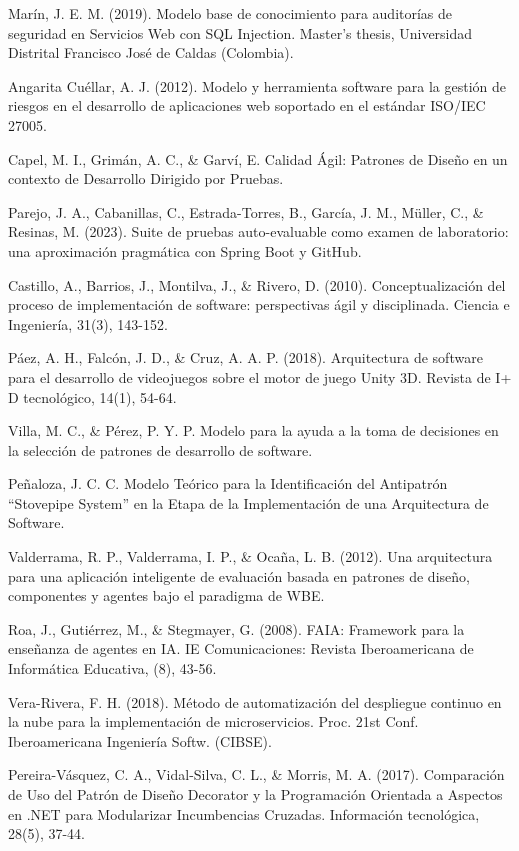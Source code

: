 \documentclass[12pt]{article}
\begin{document}
Marín, J. E. M. (2019). Modelo base de conocimiento para auditorías de seguridad en Servicios Web con SQL Injection. Master's thesis, Universidad Distrital Francisco José de Caldas (Colombia).

Angarita Cuéllar, A. J. (2012). Modelo y herramienta software para la gestión de riesgos en el desarrollo de aplicaciones web soportado en el estándar ISO/IEC 27005.

Capel, M. I., Grimán, A. C., & Garví, E. Calidad Ágil: Patrones de Diseño en un contexto de Desarrollo Dirigido por Pruebas.

Parejo, J. A., Cabanillas, C., Estrada-Torres, B., García, J. M., Müller, C., & Resinas, M. (2023). Suite de pruebas auto-evaluable como examen de laboratorio: una aproximación pragmática con Spring Boot y GitHub.

Castillo, A., Barrios, J., Montilva, J., & Rivero, D. (2010). Conceptualización del proceso de implementación de software: perspectivas ágil y disciplinada. Ciencia e Ingeniería, 31(3), 143-152.

Páez, A. H., Falcón, J. D., & Cruz, A. A. P. (2018). Arquitectura de software para el desarrollo de videojuegos sobre el motor de juego Unity 3D. Revista de I+ D tecnológico, 14(1), 54-64.

Villa, M. C., & Pérez, P. Y. P. Modelo para la ayuda a la toma de decisiones en la selección de patrones de desarrollo de software.

Peñaloza, J. C. C. Modelo Teórico para la Identificación del Antipatrón “Stovepipe System” en la Etapa de la Implementación de una Arquitectura de Software.

Valderrama, R. P., Valderrama, I. P., & Ocaña, L. B. (2012). Una arquitectura para una aplicación inteligente de evaluación basada en patrones de diseño, componentes y agentes bajo el paradigma de WBE.

Roa, J., Gutiérrez, M., & Stegmayer, G. (2008). FAIA: Framework para la enseñanza de agentes en IA. IE Comunicaciones: Revista Iberoamericana de Informática Educativa, (8), 43-56.

Vera-Rivera, F. H. (2018). Método de automatización del despliegue continuo en la nube para la implementación de microservicios. Proc. 21st Conf. Iberoamericana Ingeniería Softw. (CIBSE).

Pereira-Vásquez, C. A., Vidal-Silva, C. L., & Morris, M. A. (2017). Comparación de Uso del Patrón de Diseño Decorator y la Programación Orientada a Aspectos en .NET para Modularizar Incumbencias Cruzadas. Información tecnológica, 28(5), 37-44.
\end{document}
